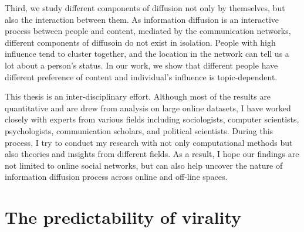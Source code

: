 \documentclass[phd,tocprelim]{cornell}
\begin{document}

Third, we study different components of diffusion not only by themselves, but also the interaction between them. As information diffusion is an interactive process between people and content, mediated by the communication networks, different components of diffusoin do not exist in isolation. People with high influence tend to cluster together\cite{Aral-2012}, and the location in the network can tell us a lot about a person's status\cite{Kempe-2003,Backstrom:2006}. In our work, we show that different people have different preference of content and individual's influence is topic-dependent.


This thesis is an inter-disciplinary effort. Although most of the results are quantitative and are drew from analysis on large online datasets, I have worked closely with experts from various fields including sociologists, computer scientists, psychologists, communication scholars, and political scientists. During this process, I try to conduct my research with not only computational methods but also theories and insights from different fields. As a result, I hope our findings are not limited to online social networks, but can also help uncover the nature of information diffusion process across online and off-line spaces.


\section{The predictability of virality}
\end{document}
